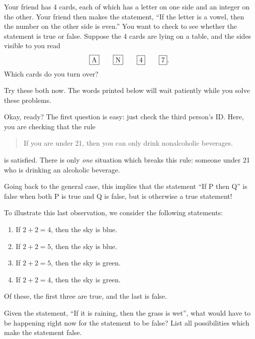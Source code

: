 \documentclass{tufte-book}
\begin{document}
\begin{example}
  Your friend has 4 cards, each of which has a letter on one side and an integer on the other. Your friend then makes the statement, ``If the letter is a vowel, then the number on the other side is even.'' You want to check to see whether the statement is true or false. Suppose the 4 cards are lying on a table, and the sides visible to you read
  \[
  \framebox{A} \qquad \framebox{N} \qquad \framebox{4} \qquad \framebox{7}.
  \]
  Which cards do you turn over? 
\end{example}

Try these both now. The words printed below will wait patiently while you solve these problems.

\begin{center}
{\Large\Clocklogo}
\end{center}

Okay, ready? The first question is easy: just check the third person's ID. Here, you are checking that the rule
\begin{quote}
  If you are under 21, then you can only drink nonalcoholic beverages.
\end{quote}
is satisfied. There is only \emph{one} situation which breaks this rule: someone under 21 who is drinking an alcoholic beverage. 

Going back to the general case, this implies that the statement ``If P then Q'' is false when both P is true and Q is false, but is otherwise a true statement!

To illustrate this last observation, we consider the following statements:
\begin{enumerate}
    \item If $2 + 2 = 4$, then the sky is blue.
    \item If $2 + 2 = 5$, then the sky is blue.
    \item If $2 + 2 = 5$, then the sky is green.
    \item If $2 + 2 = 4$, then the sky is green.
\end{enumerate}
Of these, the first three are true, and the last is false.
\begin{example}
  Given the statement, ``If it is raining, then the grass is wet'', what would have to be happening right now for the statement to be false? List all possibilities which make the statement false.
\end{example}
\end{document}
